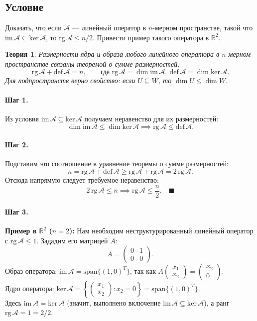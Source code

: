 \documentclass[12pt,a4paper]{article}
\theoremstyle{solution}
\newtheorem*{theory}{Теория}
\newcommand{\step}[1]{\paragraph{Шаг #1.}}
\newcommand{\R}{\mathbb{R}}
\begin{document}
\subsection*{Условие}
Доказать, что если $\mathcal{A}$ — линейный оператор в $n$-мерном пространстве, такой что $\mathrm{im}\,\mathcal{A} \subseteq \mathrm{ker}\,\mathcal{A}$, то $\mathrm{rg}\,\mathcal{A} \leq n/2$. Привести пример такого оператора в $\R^2$.

\begin{theory}
Размерности ядра и образа любого линейного оператора в $n$-мерном пространстве связаны теоремой о сумме размерностей:
\[
\mathrm{rg}\,\mathcal{A} + \mathrm{def}\,\mathcal{A} = n, \qquad \text{где } \mathrm{rg}\,\mathcal{A} = \dim \mathrm{im}\,\mathcal{A}, \ \mathrm{def}\,\mathcal{A} = \dim \mathrm{ker}\,\mathcal{A}.
\]
Для подпространств верно свойство: если $U \subseteq W$, то $\dim U \leq \dim W$.
\end{theory}

\step{1} Из условия $\mathrm{im}\,\mathcal{A} \subseteq \mathrm{ker}\,\mathcal{A}$ получаем неравенство для их размерностей:
\[
\dim \mathrm{im}\,\mathcal{A} \leq \dim \mathrm{ker}\,\mathcal{A} \implies \mathrm{rg}\,\mathcal{A} \leq \mathrm{def}\,\mathcal{A}.
\]

\step{2} Подставим это соотношение в уравнение теоремы о сумме размерностей:
\[
n = \mathrm{rg}\,\mathcal{A} + \mathrm{def}\,\mathcal{A} \geq \mathrm{rg}\,\mathcal{A} + \mathrm{rg}\,\mathcal{A} = 2\,\mathrm{rg}\,\mathcal{A}.
\]
Отсюда напрямую следует требуемое неравенство:
\[
2\,\mathrm{rg}\,\mathcal{A} \leq n \implies \mathrm{rg}\,\mathcal{A} \leq \frac{n}{2}. \quad\blacksquare
\]

\step{3} \textbf{Пример в $\R^2$ ($n = 2$):}
Нам необходим неструктурированный линейный оператор с $\mathrm{rg}\,\mathcal{A} \leq 1$. Зададим его матрицей $A$:
\[
A = \begin{pmatrix} 0 & 1 \\ 0 & 0 \end{pmatrix}.
\]
Образ оператора: $\mathrm{im}\,\mathcal{A} = \mathrm{span}\{(1, 0)^T\}$, так как $A \begin{pmatrix} x_1 \\ x_2 \end{pmatrix} = \begin{pmatrix} x_2 \\ 0 \end{pmatrix}$. \\
Ядро оператора: $\mathrm{ker}\,\mathcal{A} = \left\{ \begin{pmatrix} x_1 \\ x_2 \end{pmatrix} : x_2 = 0 \right\} = \mathrm{span}\{(1, 0)^T\}$. \\
Здесь $\mathrm{im}\,\mathcal{A} = \mathrm{ker}\,\mathcal{A}$ (значит, выполнено включение $\mathrm{im}\,\mathcal{A} \subseteq \mathrm{ker}\,\mathcal{A}$), а ранг $\mathrm{rg}\,\mathcal{A} = 1 = 2/2$.
\end{document}
